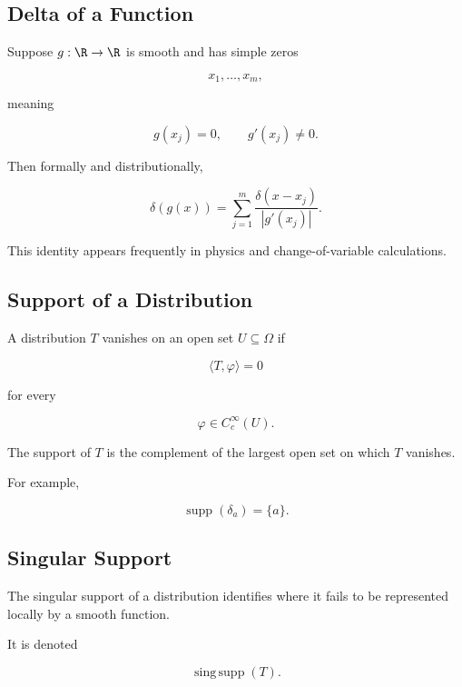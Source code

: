 \subsection{Delta of a Function}
\label{subsec:delta-of-function}

Suppose \(g:\R\to\R\) is smooth and has simple zeros

\[
x_1,\ldots,x_m,
\]

meaning

\[
g(x_j)=0,
\qquad
g'(x_j)\neq0.
\]

Then formally and distributionally,

\[
\boxed{
\delta(g(x))
=
\sum_{j=1}^{m}
\frac{\delta(x-x_j)}
{|g'(x_j)|}.
}
\]

This identity appears frequently in physics and change-of-variable
calculations.

\subsection{Support of a Distribution}
\label{subsec:support-distribution}

A distribution \(T\) vanishes on an open set \(U\subseteq\Omega\) if

\[
\boxed{
\langle T,\varphi\rangle=0
}
\]

for every

\[
\varphi\in C_c^\infty(U).
\]

The support of \(T\) is the complement of the largest open set on which
\(T\) vanishes.

For example,

\[
\boxed{
\operatorname{supp}(\delta_a)=\{a\}.
}
\]

\subsection{Singular Support}
\label{subsec:singular-support}

The singular support of a distribution identifies where it fails to be
represented locally by a smooth function.

It is denoted

\[
\boxed{
\operatorname{sing\,supp}(T).
}
\]

